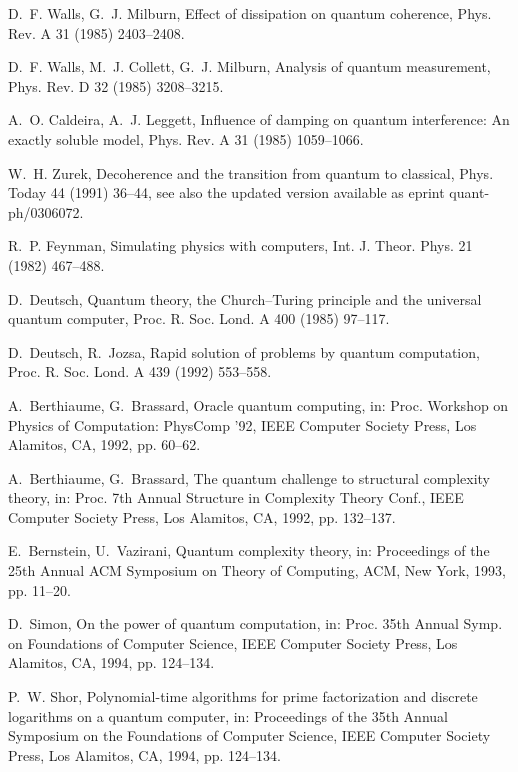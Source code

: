 \documentclass[3p,sort&compress]{elsarticle}
\begin{document}
\begin{thebibliography}{100}
D.~F. Walls, G.~J. Milburn, Effect of dissipation on quantum coherence, Phys.
  Rev. A 31 (1985) 2403--2408.

D.~F. Walls, M.~J. Collett, G.~J. Milburn, Analysis of quantum measurement,
  Phys. Rev. D 32 (1985) 3208--3215.

A.~O. Caldeira, A.~J. Leggett, Influence of damping on quantum interference:
  {A}n exactly soluble model, Phys. Rev. A 31 (1985) 1059--1066.

W.~H. Zurek, Decoherence and the transition from quantum to classical, Phys.
  Today 44 (1991) 36--44, see also the updated version available as eprint
  quant-ph/0306072.

R.~P. Feynman, Simulating physics with computers, Int. J. Theor. Phys. 21
  (1982) 467--488.

D.~Deutsch, Quantum theory, the {C}hurch--{T}uring principle and the universal
  quantum computer, Proc. R. Soc. Lond. A 400 (1985) 97--117.

D.~Deutsch, R.~Jozsa, Rapid solution of problems by quantum computation, Proc.
  R. Soc. Lond. A 439 (1992) 553--558.

A.~Berthiaume, G.~Brassard, Oracle quantum computing, in: Proc. Workshop on
  Physics of Computation: PhysComp '92, IEEE Computer Society Press, Los
  Alamitos, CA, 1992, pp. 60--62.

A.~Berthiaume, G.~Brassard, The quantum challenge to structural complexity
  theory, in: Proc. 7th Annual Structure in Complexity Theory Conf., IEEE
  Computer Society Press, Los Alamitos, CA, 1992, pp. 132--137.

E.~Bernstein, U.~Vazirani, Quantum complexity theory, in: Proceedings of the
  25th Annual ACM Symposium on Theory of Computing, ACM, New York, 1993, pp.
  11--20.

D.~Simon, On the power of quantum computation, in: Proc. 35th Annual Symp. on
  Foundations of Computer Science, IEEE Computer Society Press, Los Alamitos,
  CA, 1994, pp. 124--134.

P.~W. Shor, Polynomial-time algorithms for prime factorization and discrete
  logarithms on a quantum computer, in: Proceedings of the 35th Annual
  Symposium on the Foundations of Computer Science, IEEE Computer Society
  Press, Los Alamitos, CA, 1994, pp. 124--134.


\end{thebibliography}
\end{document}
